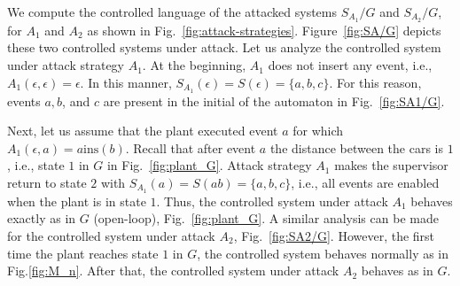 \begin{example}
We compute the controlled language of the attacked systems $S_{A_1}/G$ and $S_{A_2}/G$, for $A_1$ and $A_2$ as shown in Fig.~\ref{fig:attack-strategies}.
Figure~\ref{fig:SA/G} depicts these two controlled systems under attack.
Let us analyze the controlled system under attack strategy $A_1$. 
At the beginning, $A_1$ does not insert any event, i.e., $A_1(\epsilon,\epsilon) = \epsilon$.
In this manner, $S_{A_1}(\epsilon) = S(\epsilon) = \{a,b,c\}$. 
For this reason, events $a,b$, and $c$ are present in the initial of the automaton in Fig.~\ref{fig:SA1/G}.

Next, let us assume that the plant executed event $a$ for which $A_1(\epsilon, a) = a\text{ins}(b)$.
Recall that after event $a$ the distance between the cars is $1$, i.e., state $1$ in $G$ in Fig.~\ref{fig:plant_G}. 
Attack strategy $A_1$ makes the supervisor return to state $2$ with $S_{A_1}(a) = S(ab) = \{a,b,c\}$, i.e., all events are enabled when the plant is in state $1$.
Thus, the controlled system under attack $A_1$ behaves exactly as in $G$ (open-loop), Fig.~\ref{fig:plant_G}.
A similar analysis can be made for the controlled system under attack $A_2$, Fig.~\ref{fig:SA2/G}.
However, the first time the plant reaches state $1$ in $G$, the controlled system behaves normally as in Fig.\ref{fig:M_n}.
After that, the controlled system under attack $A_2$ behaves as in $G$.



\end{example}
